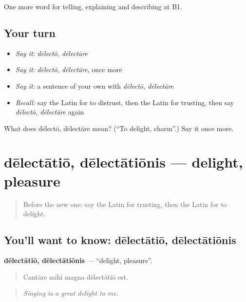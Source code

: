 \begin{grammarlens}[title={What you've built}]
One more word for telling, explaining and describing at B1.
\end{grammarlens}

\subsection*{Your turn}
\begin{itemize}
\raggedright
  \item \emph{Say it:} \emph{dēlectō, dēlectāre}
  \item \emph{Say it:} \emph{dēlectō, dēlectāre}, once more
  \item \emph{Say it:} a sentence of your own with \emph{dēlectō, dēlectāre}
  \item \emph{Recall:} say the Latin for to distrust, then the Latin for trusting, then say \emph{dēlectō, dēlectāre} again
\end{itemize}

\begin{tcolorbox}[breakable,colback=teal!4,colframe=teal!35!black,title={Before you move on}]
What does dēlectō, dēlectāre mean? (\textquotedblleft{}To delight, charm\textquotedblright{}.) Say it once more.
\end{tcolorbox}
\section[dēlectātiō, dēlectātiōnis]{dēlectātiō, dēlectātiōnis — delight, pleasure}

\label{lesson:LA-C499-delectatio}



\begin{quote}
Before the new one: say the Latin for trusting, then the Latin for to delight.
\end{quote}

\subsection*{You'll want to know: dēlectātiō, dēlectātiōnis}
\textbf{dēlectātiō, dēlectātiōnis} — \textquotedblleft{}delight, pleasure\textquotedblright{}.

\begin{quote}
Cantāre mihi magna dēlectātiō est.
\end{quote}

\begin{quote}
\emph{Singing is a great delight to me.}
\end{quote}

